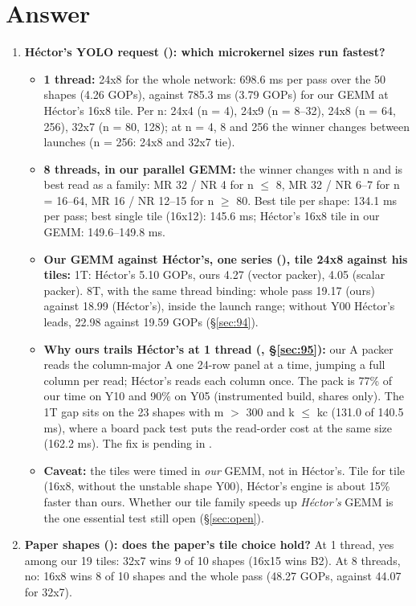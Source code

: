 \section*{Answer}
\begin{enumerate}\setlength\itemsep{4pt}
\item \textbf{H\'ector's YOLO request (): which microkernel sizes run fastest?}
  \begin{itemize}\setlength\itemsep{1pt}
  \item \textbf{1 thread:} 24x8 for the whole network: 698.6 ms per pass over the 50 shapes (4.26 GOPs), against 785.3 ms (3.79 GOPs) for our GEMM at H\'ector's 16x8 tile. Per n: 24x4 (n = 4), 24x9 (n = 8--32), 24x8 (n = 64, 256), 32x7 (n = 80, 128); at n = 4, 8 and 256 the winner changes between launches (n = 256: 24x8 and 32x7 tie).
  \item \textbf{8 threads, in our parallel GEMM:} the winner changes with n and is best read as a family: MR 32 / NR 4 for n $\le$ 8, MR 32 / NR 6--7 for n = 16--64, MR 16 / NR 12--15 for n $\ge$ 80. Best tile per shape: 134.1 ms per pass; best single tile (16x12): 145.6 ms; H\'ector's 16x8 tile in our GEMM: 149.6--149.8 ms.
  \item \textbf{Our GEMM against H\'ector's, one series (), tile 24x8 against his tiles:} 1T: H\'ector's 5.10 GOPs, ours 4.27 (vector packer), 4.05 (scalar packer). 8T, with the same thread binding: whole pass 19.17 (ours) against 18.99 (H\'ector's), inside the launch range; without Y00 H\'ector's leads, 22.98 against 19.59 GOPs (\S\ref{sec:94}).
  \item \textbf{Why ours trails H\'ector's at 1 thread (, \S\ref{sec:95}):} our A packer reads the column-major A one 24-row panel at a time, jumping a full column per read; H\'ector's reads each column once. The pack is 77\% of our time on Y10 and 90\% on Y05 (instrumented build, shares only). The 1T gap sits on the 23 shapes with m $>$ 300 and k $\le$ kc (131.0 of 140.5 ms), where a board pack test puts the read-order cost at the same size (162.2 ms). The fix is pending in .
  \item \textbf{Caveat:} the tiles were timed in \emph{our} GEMM, not in H\'ector's. Tile for tile (16x8, without the unstable shape Y00), H\'ector's engine is about 15\% faster than ours. Whether our tile family speeds up \emph{H\'ector's} GEMM is the one essential test still open (\S\ref{sec:open}).
  \end{itemize}
\item \textbf{Paper shapes (): does the paper's tile choice hold?} At 1 thread, yes among our 19 tiles: 32x7 wins 9 of 10 shapes (16x15 wins B2). At 8 threads, no: 16x8 wins 8 of 10 shapes and the whole pass (48.27 GOPs, against 44.07 for 32x7).

\end{enumerate}
